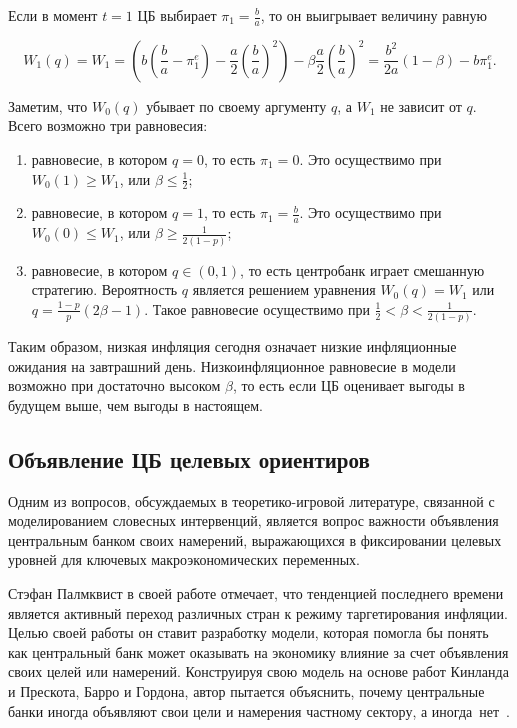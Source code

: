 \documentclass[14pt,a4paper, oneside]{extreport}
\begin{document}
Если в момент $t=1$ ЦБ выбирает $\pi_1 = \frac{b}{a}$, то он выигрывает величину равную 

\begin{equation}
W_1(q) = W_1 = \left(b \left(\frac{b}{a}-\pi_1^e \right) - \frac{a}{2} \left(\frac{b}{a} \right)^2 \right) - \beta \frac{a}{2} \left(\frac{b}{a}\right)^2 = \frac{b^2}{2a} (1-\beta) - b \pi_1^e.
\end{equation}

Заметим, что $W_0(q)$ убывает по своему аргументу $q$, а $W_1$ не зависит от $q$. Всего возможно три равновесия:

\begin{enumerate}
\item равновесие, в котором $q=0$, то есть $\pi_1 = 0$. Это осуществимо при $W_0(1) \ge W_1$, или $\beta \le \frac{1}{2}$;

\item равновесие, в котором $q=1$, то есть $\pi_1 = \frac{b}{a}$. Это осуществимо при $W_0(0) \le W_1$, или $\beta \ge \frac{1}{2(1-p)}$;

\item равновесие, в котором $q \in (0,1)$, то есть центробанк играет смешанную стратегию. Вероятность $q$ является решением уравнения $W_0(q) = W_1$ или $q= \frac{1-p}{p} (2 \beta -1)$. Такое равновесие осуществимо при $\frac{1}{2} < \beta < \frac{1}{2(1-p)}.$

\end{enumerate}

Таким образом, низкая инфляция сегодня означает низкие инфляционные ожидания на завтрашний день. Низкоинфляционное равновесие в модели возможно при достаточно высоком $\beta$, то есть если ЦБ оценивает выгоды в будущем выше, чем выгоды в настоящем. 

\subsection{Объявление ЦБ целевых ориентиров} 
Одним из вопросов, обсуждаемых в теоретико-игровой литературе, связанной с моделированием словесных интервенций, является вопрос важности объявления центральным банком своих намерений, выражающихся в фиксировании целевых уровней для ключевых макроэкономических переменных.   
  
Стэфан Палмквист в своей работе отмечает, что тенденцией последнего времени является активный переход различных стран к режиму таргетирования инфляции. Целью своей работы он ставит разработку модели, которая помогла бы понять как центральный банк может оказывать на экономику влияние за счет объявления своих целей или намерений. Конструируя свою модель на основе работ Кинланда и Прескота, Барро и Гордона, автор пытается объяснить, почему центральные банки иногда объявляют свои цели и намерения частному сектору, а иногда~нет~\cite{palmqvist1998central}.
\end{document}
